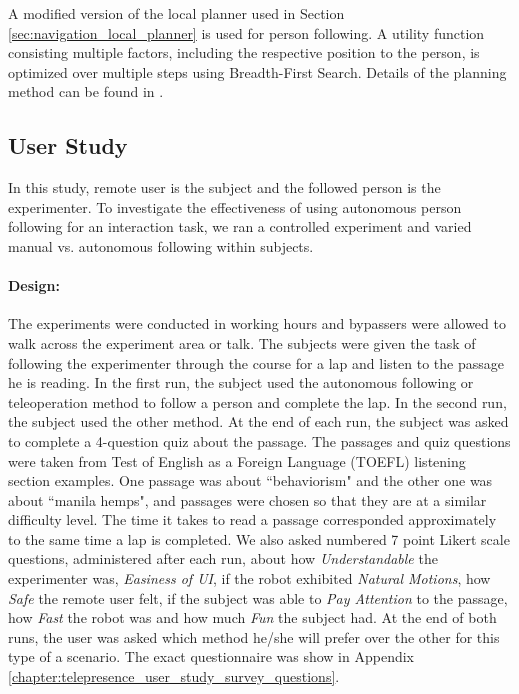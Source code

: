 A modified version of the local planner used in Section \ref{sec:navigation_local_planner} is used for person following. A utility function consisting multiple factors, including the respective position to the person, is optimized over multiple steps using Breadth-First Search. Details of the planning method can be found in \cite{cosgun2013autonomous}.

\subsection{User Study}

In this study, remote user is the subject and the followed person is the experimenter. To investigate the effectiveness of using autonomous person following for an interaction task, we ran a controlled experiment and varied manual vs. autonomous following within subjects.

\paragraph{Design:}
The experiments were conducted in working hours and bypassers were allowed to walk across the experiment area or talk. The subjects were given the task of following the experimenter through the course for a lap and listen to the passage he is reading. In the first run, the subject used the autonomous following or teleoperation method to follow a person and complete the lap. In the second run, the subject used the other method. At the end of each run, the subject was asked to complete a 4-question quiz about the passage. The passages and quiz questions were taken from Test of English as a Foreign Language (TOEFL) listening section examples. One passage was about ``behaviorism" and the other one was about ``manila hemps", and passages were chosen so that they are at a similar difficulty level. The time it takes to read a passage corresponded approximately to the same time a lap is completed. We also asked numbered 7 point Likert scale questions, administered after each run, about how \emph{Understandable} the experimenter was, \emph{Easiness of UI}, if the robot exhibited \emph {Natural Motions}, how \emph{Safe} the remote user felt, if the subject was able to \emph{Pay Attention} to the passage, how \emph{Fast} the robot was and how much \emph{Fun} the subject had. At the end of both runs, the user was asked which method he/she will prefer over the other for this type of a scenario. The exact questionnaire was show in Appendix \ref{chapter:telepresence_user_study_survey_questions}.

